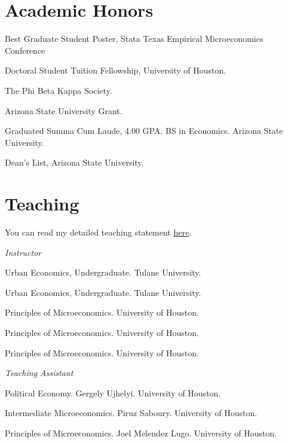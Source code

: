 \documentclass[letterpaper]{article}
\renewenvironment{itemize}{
  \begin{list}{}{
    \setlength{\leftmargin}{1.5em}
  }
}{
  \end{list}
}
\begin{document}
\section*{Academic Honors}
\vspace{2 mm}
\begin{itemize}
\item {} Best Graduate Student Poster, Stata Texas Empirical Microeconomics Conference
\item {} Doctoral Student Tuition Fellowship, University of Houston. 
\item {} The Phi Beta Kappa Society. 
\item {} Arizona State University Grant. 
\item {} Graduated Summa Cum Laude, 4.00 GPA. BS in Economics. Arizona State University. 
\item {} Dean's List, Arizona State University. 
\end{itemize}
\vspace{2 mm}

\section*{Teaching}
\vspace{2 mm}

You can read my detailed teaching statement \href{https://hhadah.github.io/statements/Hadah_Teaching.pdf}{here}.

\textit{Instructor}
\begin{itemize}
\item {}Urban Economics, Undergraduate. Tulane University.
\item {}Urban Economics, Undergraduate. Tulane University.
\item {}Principles of Microeconomics. University of Houston.
\item {}Principles of Microeconomics. University of Houston.
\item {}Principles of Microeconomics. University of Houston.

\end{itemize}
\textit{Teaching Assistant}
\begin{itemize}
\item {}Political Economy. Gergely Ujhelyi. University of Houston.
\item {}Intermediate Microeconomics. Piruz Saboury. University of Houston.
\item {}Principles of Microeconomics. Joel Melendez Lugo. University of Houston.

\end{itemize}
\vspace{2 mm}
\end{document}
